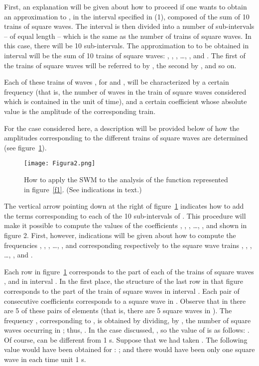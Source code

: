 \documentclass[11pt]{rMTA2010} \usepackage[utf8]{inputenc} \usepackage{graphicx} \usepackage{booktabs} \usepackage{array} \usepackage{enumerate}
\begin{document}
First, an explanation will be given about how to proceed if one wants to obtain an approximation to , in the interval  specified in (1), composed of the sum of 10 trains of square waves. The interval  is then divided into a number of sub-intervals -- of equal length -- which is the same as the number of trains of square waves. In this case, there will be 10 sub-intervals. The approximation to  to be obtained in interval  will be the sum of 10 trains of square waves: , , , \ldots, , and . The first of the trains of square waves will be referred to by , the second by , and so on.

Each of these trains of waves , for  and , will be characterized by a certain frequency  (that is, the number of waves in the train of square waves considered which is contained in the unit of time), and a certain coefficient   whose absolute value is the amplitude of the corresponding train.

For the case considered here, a description will be provided below of how the amplitudes corresponding to the different trains of square waves are determined (see figure~\ref{f2}).

\begin{figure}[H]
\centering
\texttt{[image: Figura2.png]}
\caption{How to apply the SWM to the analysis of the function represented in figure~\ref{f1}. (See indications in text.)}
\label{f2}
\end{figure}

The vertical arrow pointing down at the right of figure~\ref{f2} indicates how to add the terms corresponding to each of the 10 sub-intervals of .  This procedure will make it possible to compute the values of the coefficients , , , \ldots, , and  shown in figure 2. First, however, indications will be given about how to compute the frequencies , , , \ldots, , and  corresponding respectively to the square wave trains , , , \ldots, , and .

Each row in figure~\ref{f2} corresponds to the part of each of the trains of square waves , and  in interval . In the first place, the structure of the last row in that figure corresponds to the part of the train of square waves  in interval . Each pair of consecutive coefficients  corresponds to a square wave in . Observe that in  there are 5 of these pairs of elements (that is, there are 5 square waves in ). The frequency , corresponding to , is obtained by dividing, by , the number of square waves occurring in ; thus, . In the case discussed, , so the value of  is as follows: . Of course,  can be different from 1 s.  Suppose that we had taken . The following value would have been obtained for : ; and there would have been only one square wave in each time unit 1 s.
\end{document}
